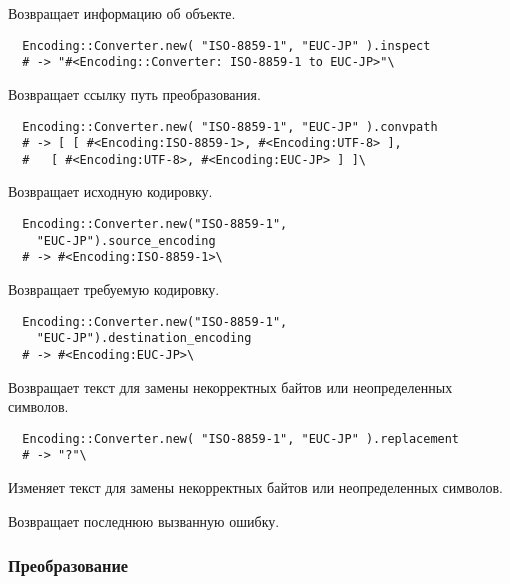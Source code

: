 \begin{methodlist}
  Возвращает информацию об объекте.
  \begin{verbatim}
  Encoding::Converter.new( "ISO-8859-1", "EUC-JP" ).inspect 
  # -> "#<Encoding::Converter: ISO-8859-1 to EUC-JP>"\
  \end{verbatim} 
 
  Возвращает ссылку путь преобразования.
  \begin{verbatim}
  Encoding::Converter.new( "ISO-8859-1", "EUC-JP" ).convpath 
  # -> [ [ #<Encoding:ISO-8859-1>, #<Encoding:UTF-8> ],
  #   [ #<Encoding:UTF-8>, #<Encoding:EUC-JP> ] ]\
  \end{verbatim}
 
  Возвращает исходную кодировку.
  \begin{verbatim}
  Encoding::Converter.new("ISO-8859-1",
    "EUC-JP").source_encoding 
  # -> #<Encoding:ISO-8859-1>\
  \end{verbatim}
 
  Возвращает требуемую кодировку. 
  \begin{verbatim}
  Encoding::Converter.new("ISO-8859-1",
    "EUC-JP").destination_encoding 
  # -> #<Encoding:EUC-JP>\
  \end{verbatim}

  Возвращает текст для замены некорректных байтов или неопределенных символов. 
  \begin{verbatim}
  Encoding::Converter.new( "ISO-8859-1", "EUC-JP" ).replacement
  # -> "?"\
  \end{verbatim}
 
  Изменяет текст для замены некорректных байтов или неопределенных символов. 
 
  Возвращает последнюю вызванную ошибку.
\end{methodlist}

\subsubsection*{Преобразование}

